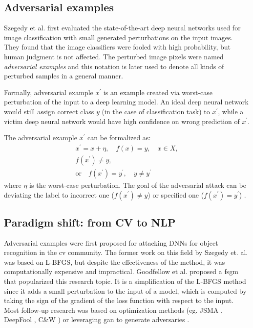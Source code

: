 \subsection{Adversarial examples}\label{subsec:adversarial-attacks}

Szegedy et al. \cite{szegedy2013intriguing} first evaluated the state-of-the-art deep neural networks used for image classification with small generated perturbations on the input images.
They found that the image classifiers were fooled with high probability, but human judgment is not affected. The perturbed image pixels were named \emph{adversarial examples} and this notation is later used to denote all kinds of perturbed samples in a general manner.

Formally, adversarial example $x^\prime$ is an example created via worst-case perturbation of the input to a deep learning model. An ideal deep neural network would still assign correct class $y$ (in the case of classification task) to $x^\prime$, 
while a victim deep neural network would have high confidence on wrong prediction of $x^\prime$. 

\noindent The adversarial example $x^\prime$ can be formalized as:
\begin{equation}
    \begin{array}{l}
    x^\prime = x + \eta, \quad f(x)=y, \quad x \in X,\\
    f(x^\prime) \neq y, \\
    \text{or} \quad f(x^\prime) = y^\prime, \quad y \neq y^\prime
    \end{array}
\end{equation}
where $\eta$ is the worst-case perturbation. The goal of the adversarial attack can be deviating the label to incorrect one ($f(x^\prime) \neq y$) or specified one ($f(x^\prime) = y^\prime$) \cite{journals/tist/ZhangSAL20}.

\subsection[Paradigm shift]{Paradigm shift: from CV to NLP}\label{subsec:paradigm-shift}
Adversarial examples were first proposed for attacking DNNs for object recognition in the \acrfull{cv} community.
The former work on this field by Szegedy et. al. \cite{szegedy2013intriguing}  was based on L-BFGS, but despite the effectiveness of the method, it was computationally expensive and impractical.
Goodfellow et al. \cite{goodfellow2014explaining} proposed a \acrfull{fsgm} that popularized this research topic. It is a simplification of the L-BFGS method since it adds a small perturbation to the input of a model, which is computed by taking the sign of the gradient of the loss function with respect to the input.
Most follow-up research was based on optimization methods (eg. JSMA \cite{journals/corr/PapernotMJFCS15}, DeepFool \cite{journals/corr/Moosavi-Dezfooli15}, C\&W \cite{journals/corr/CarliniW16a}) or leveraging \acrfull{gan} to generate adversaries \cite{journals/corr/abs-1710-11342}.

